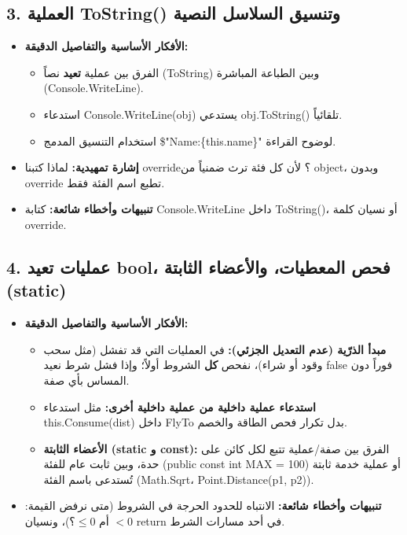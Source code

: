 \documentclass[14pt]{extarticle}
\begin{document}
\subsection*{3. العملية \textenglish{ToString()} وتنسيق السلاسل النصية}
\begin{itemize}[itemsep=0.3em]
    \item \textbf{الأفكار الأساسية والتفاصيل الدقيقة:}
    \begin{itemize}
        \item الفرق بين عملية \textbf{تعيد} نصاً (\textenglish{ToString}) وبين الطباعة المباشرة (\textenglish{Console.WriteLine}).
        \item استدعاء \textenglish{Console.WriteLine(obj)} يستدعي \textenglish{obj.ToString()} تلقائياً.
        \item استخدام التنسيق المدمج \textenglish{\$"Name:\{this.name\}"} لوضوح القراءة.
    \end{itemize}
    \item \textbf{إشارة تمهيدية:} لماذا كتبنا \textenglish{override}؟ لأن كل فئة ترث ضمنياً من \textenglish{object}، وبدون \textenglish{override} تطبع اسم الفئة فقط.
    \item \textbf{تنبيهات وأخطاء شائعة:} كتابة \textenglish{Console.WriteLine} داخل \textenglish{ToString()}، أو نسيان كلمة \textenglish{override}.
\end{itemize}

\filbreak
\subsection*{4. عمليات تعيد \textenglish{bool}، فحص المعطيات، والأعضاء الثابتة (\textenglish{static})}
\begin{itemize}[itemsep=0.3em]
    \item \textbf{الأفكار الأساسية والتفاصيل الدقيقة:}
    \begin{itemize}
        \item \textbf{مبدأ الذرّية (عدم التعديل الجزئي):} في العمليات التي قد تفشل (مثل سحب وقود أو شراء)، نفحص \textbf{كل} الشروط أولاً؛ وإذا فشل شرط نعيد \textenglish{false} فوراً دون المساس بأي صفة.
        \item \textbf{استدعاء عملية داخلية من عملية داخلية أخرى:} مثل استدعاء \textenglish{this.Consume(dist)} داخل \textenglish{FlyTo} بدل تكرار فحص الطاقة والخصم.
        \item \textbf{الأعضاء الثابتة (\textenglish{static} و \textenglish{const}):} الفرق بين صفة/عملية تتبع لكل كائن على حدة، وبين ثابت عام للفئة (\textenglish{public const int MAX = 100}) أو عملية خدمة ثابتة تُستدعى باسم الفئة (\textenglish{Math.Sqrt}، \textenglish{Point.Distance(p1, p2)}).
    \end{itemize}
    \item \textbf{تنبيهات وأخطاء شائعة:} الانتباه للحدود الحرجة في الشروط (متى نرفض القيمة: $< 0$ أم $\le 0$؟)، ونسيان \textenglish{return} في أحد مسارات الشرط.
\end{itemize}
\end{document}
